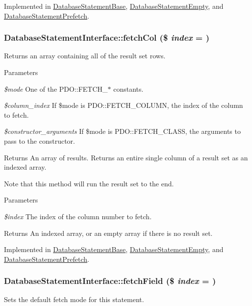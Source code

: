 Implemented in \hyperlink{classDatabaseStatementBase_af1eb19aab88b13d6045bd6cce1b3c573}{DatabaseStatementBase}, \hyperlink{classDatabaseStatementEmpty_a4e3f452f86f9be6c96db961d0e734a37}{DatabaseStatementEmpty}, and \hyperlink{classDatabaseStatementPrefetch_ac3c2ce6d7d81888a503d8508e5562d2f}{DatabaseStatementPrefetch}.\hypertarget{interfaceDatabaseStatementInterface_a1c66bf4ef84ffd4710fa6545974cdf23}{
\subsubsection[{fetchCol}]{\setlength{\rightskip}{0pt plus 5cm}DatabaseStatementInterface::fetchCol (\$ {\em index} = {})}}
\label{interfaceDatabaseStatementInterface_a1c66bf4ef84ffd4710fa6545974cdf23}
Returns an array containing all of the result set rows.


\begin{DoxyParams}{Parameters}
\item[{\em \$mode}]One of the PDO::FETCH\_\-$\ast$ constants. \item[{\em \$column\_\-index}]If \$mode is PDO::FETCH\_\-COLUMN, the index of the column to fetch. \item[{\em \$constructor\_\-arguments}]If \$mode is PDO::FETCH\_\-CLASS, the arguments to pass to the constructor.\end{DoxyParams}
\begin{DoxyReturn}{Returns}
An array of results. Returns an entire single column of a result set as an indexed array.
\end{DoxyReturn}
Note that this method will run the result set to the end.


\begin{DoxyParams}{Parameters}
\item[{\em \$index}]The index of the column number to fetch.\end{DoxyParams}
\begin{DoxyReturn}{Returns}
An indexed array, or an empty array if there is no result set. 
\end{DoxyReturn}


Implemented in \hyperlink{classDatabaseStatementBase_a0f1eb97063c61c3c0dc98b946595bc5b}{DatabaseStatementBase}, \hyperlink{classDatabaseStatementEmpty_a51d1a6428d3357315eab407864c08826}{DatabaseStatementEmpty}, and \hyperlink{classDatabaseStatementPrefetch_abf394498c6665e5f89c02e5e4a6292e1}{DatabaseStatementPrefetch}.\hypertarget{interfaceDatabaseStatementInterface_a66325e9222c90de0fc87c201652be9e4}{
\subsubsection[{fetchField}]{\setlength{\rightskip}{0pt plus 5cm}DatabaseStatementInterface::fetchField (\$ {\em index} = {})}}
\label{interfaceDatabaseStatementInterface_a66325e9222c90de0fc87c201652be9e4}
Sets the default fetch mode for this statement.

